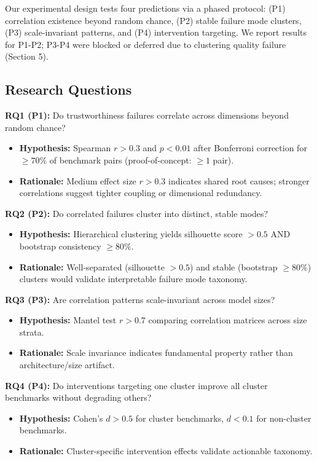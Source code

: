 Our experimental design tests four predictions via a phased protocol: (P1) correlation existence beyond random chance, (P2) stable failure mode clusters, (P3) scale-invariant patterns, and (P4) intervention targeting. We report results for P1-P2; P3-P4 were blocked or deferred due to clustering quality failure (Section 5).

\subsection{Research Questions}

\textbf{RQ1 (P1):} Do trustworthiness failures correlate across dimensions beyond random chance?
\begin{itemize}
\item \textbf{Hypothesis:} Spearman $r > 0.3$ and $p < 0.01$ after Bonferroni correction for $\geq 70\%$ of benchmark pairs (proof-of-concept: $\geq 1$ pair).
\item \textbf{Rationale:} Medium effect size $r > 0.3$ indicates shared root causes; stronger correlations suggest tighter coupling or dimensional redundancy.
\end{itemize}

\textbf{RQ2 (P2):} Do correlated failures cluster into distinct, stable modes?
\begin{itemize}
\item \textbf{Hypothesis:} Hierarchical clustering yields silhouette score $> 0.5$ AND bootstrap consistency $\geq 80\%$.
\item \textbf{Rationale:} Well-separated (silhouette $> 0.5$) and stable (bootstrap $\geq 80\%$) clusters would validate interpretable failure mode taxonomy.
\end{itemize}

\textbf{RQ3 (P3):} Are correlation patterns scale-invariant across model sizes?
\begin{itemize}
\item \textbf{Hypothesis:} Mantel test $r > 0.7$ comparing correlation matrices across size strata.
\item \textbf{Rationale:} Scale invariance indicates fundamental property rather than architecture/size artifact.
\end{itemize}

\textbf{RQ4 (P4):} Do interventions targeting one cluster improve all cluster benchmarks without degrading others?
\begin{itemize}
\item \textbf{Hypothesis:} Cohen's $d > 0.5$ for cluster benchmarks, $d < 0.1$ for non-cluster benchmarks.
\item \textbf{Rationale:} Cluster-specific intervention effects validate actionable taxonomy.
\end{itemize}

